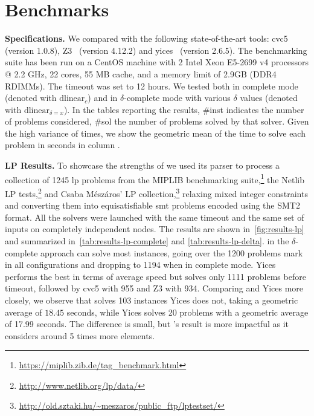 \documentclass[runningheads]{llncs}
\begin{document}
\section{Benchmarks}
\label{sec:benchmarks}

\noindent\textbf{Specifications.}
We compared \dlinear with the following state-of-the-art tools: cvc5~\cite{ref:cvc5} (version 1.0.8), Z3~\cite{ref:z3} (version 4.12.2) and yices~\cite{ref:yices} (version 2.6.5).
The benchmarking suite has been run on a CentOS machine with 2 Intel Xeon E5-2699 v4 processors @ 2.2 GHz, 22 cores, 55 MB cache, and a memory limit of 2.9GB (DDR4 RDIMMs).
The timeout was set to 12 hours.
We tested \dlinear both in complete mode (denoted with $\text{dlinear}_c$) and in $\delta$-complete mode with various $\delta$ values (denoted with $\text{dlinear}_{\delta = x}$).
In the tables reporting the results, \#inst indicates the number of problems considered, \#sol the number of problems solved by that solver.
Given the high variance of times, we show the geometric mean of the time to solve each problem in seconds in column \avgtime.


\smallskip
\noindent\textbf{LP Results.}
To showcase the strengths of \dlinear we used its parser to process a collection of 1245 \gls{lp} problems from the MIPLIB benchmarking suite,\footnote{\url{https://miplib.zib.de/tag_benchmark.html}} the Netlib LP tests,\footnote{\url{http://www.netlib.org/lp/data/}} and Csaba Mészáros' LP collection,\footnote{\url{http://old.sztaki.hu/~meszaros/public_ftp/lptestset/}} relaxing mixed integer constraints and converting them into equisatisfiable \gls{smt} problems encoded using the SMT2 format.
All the solvers were launched with the same timeout and the same set of inputs on completely independent nodes.
The results are shown in~\autoref{fig:results-lp} and summarized in~\autoref{tab:results-lp-complete} and \autoref{tab:results-lp-delta}.
\dlinear in the $\delta$-complete approach can solve most instances, going over the 1200 problems mark in all configurations and dropping to 1194 when in complete mode.
Yices performs the best in terms of average speed but solves only 1111 problems before timeout, followed by cvc5 with 955 and Z3 with 934.
Comparing \dlinear and Yices more closely, we observe that \dlinear solves 103 instances Yices does not, taking a geometric average of  $18.45$ seconds, while Yices solves 20 problems \dlinear with a geometric average of 17.99 seconds.
The difference is small, but \dlinear's result is more impactful as it considers around 5 times more elements.
\end{document}
